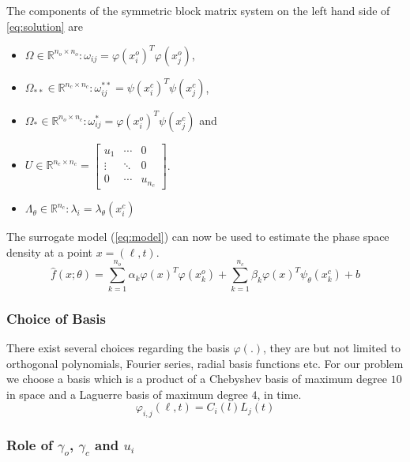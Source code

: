 %
The components of the symmetric block matrix system on the left hand side of \cref{eq:solution} 
are 
%
\begin{itemize}
\item $\Omega \in \mathbb{R}^{n_{o} \times n_{o}}: \omega_{ij} = \varphi(x^{o}_{i})^{T} \varphi(x^{o}_{j})$,
\item $\Omega_{**} \in \mathbb{R}^{n_{c} \times n_{c}}: \omega^{**}_{ij} = \psi(x^{c}_{i})^{T} \psi(x^{c}_{j})$,
\item $\Omega_{*} \in \mathbb{R}^{n_{o} \times n_{c}}: \omega^{*}_{ij} = \varphi(x^{o}_{i})^{T} \psi(x^{c}_{j})$ and 
\item $U \in \mathbb{R}^{n_{c} \times n_{c}} = \begin{bmatrix}
    u_1 & \cdots & 0 \\ 
    \vdots & \ddots  & 0\\ 
    0 & \cdots  & u_{n_{c}} 
  \end{bmatrix}$.
\item $\Lambda_{\theta} \in \mathbb{R}^{n_{c}}: \lambda_{i} = \lambda_{\theta}(x^{c}_{i})$
\end{itemize}
%
The surrogate model (\cref{eq:model}) can now be used to estimate the phase space density at a 
point $x = (\ell,t)$.
%
\begin{equation}\label{eq:model}
\hat{f}(x;\theta) = 
\sum_{k = 1}^{n_{o}}{\alpha_{k}\varphi(x)^{T}\varphi(x^{o}_{k}) + 
\sum_{k = 1}^{n_{c}}}{\beta_{k} \varphi(x)^{T} \psi_{\theta}(x^{c}_{k})} + b
\end{equation}

\subsubsection*{Choice of Basis}

There exist several choices regarding the basis $\varphi(.)$, they are but not limited to 
orthogonal polynomials, Fourier series, radial basis functions etc. For our problem we choose a 
basis which is a product of a Chebyshev basis of maximum degree $10$ in space and a Laguerre basis 
of maximum degree $4$, in time.
%
\begin{equation}\label{eq:basis}
\varphi_{i,j}(\ell,t) = C_{i}(l) L_{j}(t)
\end{equation}
%


\subsubsection*{Role of $\gamma_o$, $\gamma_c$ and $u_i$}

